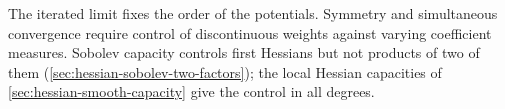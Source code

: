 The iterated limit fixes the order of the potentials. Symmetry and
simultaneous convergence require control of discontinuous weights
against varying coefficient measures. Sobolev capacity controls first
Hessians but not products of two of them
(\cref{sec:hessian-sobolev-two-factors}); the local Hessian capacities
of \cref{sec:hessian-smooth-capacity} give the control in all degrees.
